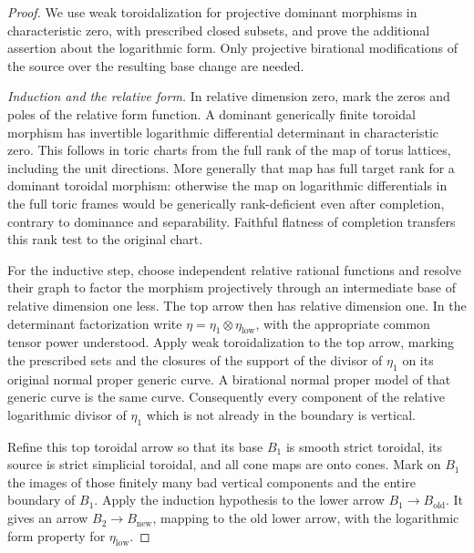 \begin{proof}
We use weak toroidalization \cite[Theorem~1.1]{ADK} for projective dominant morphisms
in characteristic zero, with prescribed closed subsets, and prove the
additional assertion about the logarithmic form.  Only projective
birational modifications of the source over the resulting base change
are needed.

\smallskip\noindent\emph{Induction and the relative form.}
In relative dimension zero, mark the zeros and poles of the relative
form function.  A dominant generically finite toroidal morphism has
invertible logarithmic differential determinant in characteristic zero.
This follows in toric charts from the full rank of the map of torus
lattices, including the unit directions.  More generally that map has
full target rank for a dominant toroidal morphism: otherwise the map on
logarithmic differentials in the full toric frames would be generically
rank-deficient even after completion, contrary to dominance and
separability.  Faithful flatness of completion transfers this rank test
to the original chart.

For the inductive step, choose independent relative rational functions
and resolve their graph to factor the morphism projectively through an
intermediate base of relative dimension one less.  The top arrow then
has relative dimension one.  In the determinant factorization write
\(\eta=\eta_1\otimes\eta_{\mathrm{low}}\), with the appropriate common
tensor power understood.  Apply weak toroidalization to the top arrow,
marking the prescribed sets and the closures of the support of the
divisor of \(\eta_1\) on its original normal proper generic curve.
A birational normal proper model of that generic curve is the same
curve.  Consequently every component of the relative logarithmic
divisor of \(\eta_1\) which is not already in the boundary is vertical.

Refine this top toroidal arrow so that its base \(B_1\) is smooth
strict toroidal, its source is strict simplicial toroidal, and all cone
maps are onto cones.  Mark on \(B_1\) the images of those finitely many
bad vertical components and the entire boundary of \(B_1\).  Apply the
induction hypothesis to the lower arrow \(B_1\to B_{\mathrm{old}}\).
It gives an arrow \(B_2\to B_{\mathrm{new}}\), mapping to the old lower
arrow, with the logarithmic form property for
\(\eta_{\mathrm{low}}\).


\end{proof}
